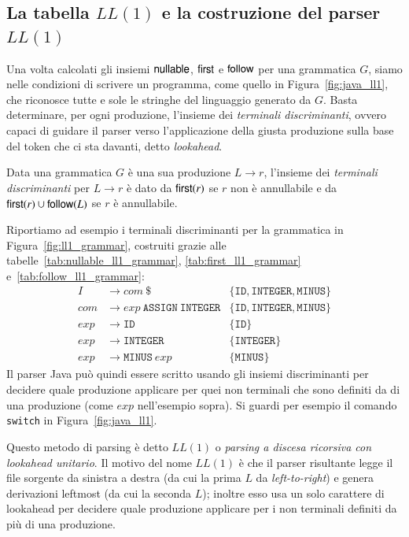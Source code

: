 \subsection{La tabella $\mathit{LL}(1)$ e la costruzione del parser
            $\mathit{LL}(1)$}
  \label{subsec:ll1_table}
%
Una volta calcolati gli insiemi $\mathsf{nullable}$, $\mathsf{first}$ e $\mathsf{follow}$
per una grammatica $G$, siamo nelle
condizioni di scrivere un programma, come quello in Figura~\ref{fig:java_ll1},
che riconosce tutte e sole le stringhe del linguaggio generato da $G$.
Basta determinare, per ogni produzione, l'insieme dei
\emph{terminali discriminanti}, ovvero capaci di guidare il parser verso
l'applicazione della giusta produzione sulla base del token che ci sta
davanti, detto \emph{lookahead}.
%
\begin{definition}\label{def:ll_discriminant}
Data una grammatica $G$ \`e una sua produzione $L\to r$, l'insieme dei
\emph{terminali discriminanti} per $L\to r$ \`e dato da $\mathsf{first}(r)$ se
$r$ non \`e annullabile e da $\mathsf{first}(r)\cup\mathsf{follow}(L)$ se $r$ \`e
annullabile.
\end{definition}
%
\noindent
Riportiamo ad esempio i terminali discriminanti per la grammatica
in Figura~\ref{fig:ll1_grammar}, costruiti grazie alle
tabelle~\eqref{tab:nullable_ll1_grammar}, \eqref{tab:first_ll1_grammar}
e~\eqref{tab:follow_ll1_grammar}:
%
\begin{align*}
  \mathit{I}&\to\mathit{com}\ \mathtt{\$} & \{\mathtt{ID},\mathtt{INTEGER},\mathtt{MINUS}\}\\
  \mathit{com}&\to\mathit{exp}\ \mathtt{ASSIGN}\ \mathtt{INTEGER} &
     \{\mathtt{ID},\mathtt{INTEGER},\mathtt{MINUS}\}\\
  \mathit{exp}&\to\mathtt{ID} & \{\mathtt{ID}\} \\
  \mathit{exp}&\to\mathtt{INTEGER} & \{\mathtt{INTEGER}\} \\
  \mathit{exp}&\to\mathtt{MINUS}\ \mathit{exp} & \{\mathtt{MINUS}\}
\end{align*}
%
Il parser Java pu\`o quindi essere scritto usando gli insiemi discriminanti
per decidere quale produzione applicare per quei non terminali che sono
definiti da \piu di una produzione (come $\mathit{exp}$ nell'esempio sopra).
Si guardi per esempio il comando \texttt{switch} in Figura~\ref{fig:java_ll1}.

Questo metodo di parsing \`e detto $\mathit{LL}(1)$
o \emph{parsing a discesa ricorsiva
con lookahead unitario}. Il motivo del nome $\mathit{LL}(1)$ \`e che il parser
risultante legge il file sorgente da sinistra a destra (da cui la prima
$L$ da \emph{left-to-right}) e genera derivazioni leftmost (da cui la
seconda $L$); inoltre esso usa un solo carattere di lookahead per decidere
quale produzione applicare per i non terminali definiti da pi\`u di una
produzione.

